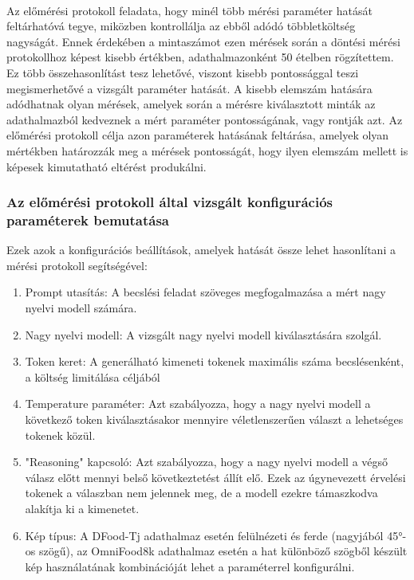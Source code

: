 \paragraph{}Az előmérési protokoll feladata, hogy minél több mérési paraméter
hatását feltárhatóvá tegye, miközben kontrollálja az ebből adódó többletköltség
nagyságát. Ennek érdekében a mintaszámot ezen mérések során a döntési mérési protokollhoz
képest kisebb értékben, adathalmazonként 50 ételben rögzítettem. Ez több összehasonlítást tesz lehetővé, viszont
kisebb pontossággal teszi megismerhetővé a vizsgált paraméter hatását. A kisebb elemszám
hatására adódhatnak olyan mérések, amelyek során a mérésre kiválasztott minták az adathalmazból
kedveznek a mért paraméter pontosságának, vagy rontják azt.
Az előmérési protokoll célja azon paraméterek hatásának feltárása, amelyek olyan
mértékben határozzák meg a mérések pontosságát, hogy ilyen elemszám mellett is képesek
kimutatható eltérést produkálni.

\subsubsection{Az előmérési protokoll által vizsgált konfigurációs paraméterek bemutatása}
Ezek azok a konfigurációs beállítások, amelyek hatását össze lehet hasonlítani
a mérési protokoll segítségével:
\begin{enumerate}
    \item Prompt utasítás:
    A becslési feladat szöveges megfogalmazása a mért nagy nyelvi modell számára.
    \item Nagy nyelvi modell:
    A vizsgált nagy nyelvi modell kiválasztására szolgál.
    \item Token keret:
    A generálható kimeneti tokenek maximális száma becslésenként, a költség limitálása
    céljából
    \item Temperature paraméter:
    Azt szabályozza, hogy a nagy nyelvi modell a
    következő token kiválasztásakor mennyire véletlenszerűen választ a lehetséges tokenek
    közül.
    \item "Reasoning" kapcsoló:
    Azt szabályozza, hogy a nagy nyelvi modell a
    végső válasz előtt mennyi belső következtetést állít elő. Ezek az úgynevezett
    érvelési tokenek a válaszban nem jelennek meg, de a modell ezekre támaszkodva
    alakítja ki a kimenetet.
    \item Kép típus:
    A DFood-Tj adathalmaz esetén felülnézeti és ferde (nagyjából 45°-os szögű), az OmniFood8k adathalmaz esetén a hat különböző szögből készült kép használatának kombinációját lehet a paraméterrel konfigurálni.
\end{enumerate}

